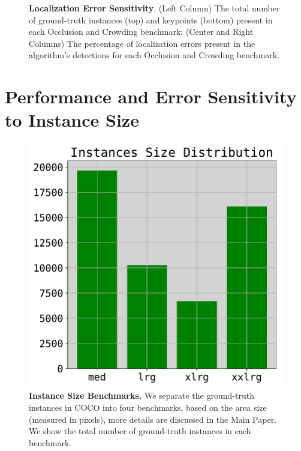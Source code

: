 \documentclass[10pt,onecolumn,letterpaper]{article}
\begin{document}
\begin{figure}[h!]
{\begin{tabular}{ccc}
\end{tabular}
}
\caption{ {\small \textbf{Localization Error Sensitivity}. (Left Column) The total number of ground-truth instances (top) and keypoints (bottom) present
 in each Occlusion and Crowding benchmark; (Center and Right Columns) The percentage of localization errors present in the algorithm's detections for each Occlusion and Crowding benchmark.}}
\end{figure}
\clearpage

\section{Performance and Error Sensitivity to Instance Size}

\begin{figure}[h!]
\centering
\includegraphics[width=.25\linewidth]{./result/rmpe/benchmarks_sensitivity/size/size_benchmarks.pdf}
\caption{ {\small \textbf{Instance Size Benchmarks.} We separate the ground-truth instances in COCO into four benchmarks, based on the area size (measured in pixels),
more details are discussed in the Main Paper. We show the total number of ground-truth instances in each benchmark.}}
\end{figure}
\end{document}
